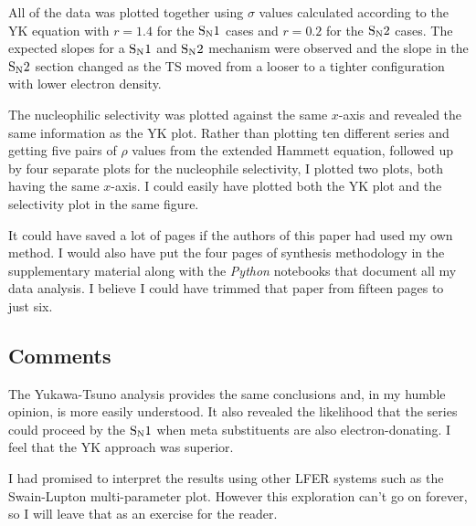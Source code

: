\documentclass{tufte-handout}
\begin{document}
All of the data was plotted together using $\sigma$ values calculated according to the YK equation with $r = 1.4$ for the $\rm S_N1$ cases and $r = 0.2$ for the $\rm S_N2$ cases. The expected slopes for a $\rm S_N1$ and $\rm S_N2$ mechanism were observed and the slope in the $\rm S_N2$ section changed as the TS moved from a looser to a tighter configuration with lower electron density.

The nucleophilic selectivity was plotted against the same $x$-axis and revealed the same information as the YK plot. Rather than plotting ten different series and getting five pairs of $\rho$ values from the extended Hammett equation, followed up by four separate plots for the nucleophile selectivity, I plotted two plots, both having the same $x$-axis. I could easily have plotted both the YK plot and the selectivity plot in the same figure. 

It could have saved a lot of pages if the authors of this paper had used my own method. I would also have put the four pages of synthesis methodology in the supplementary material along with the \textit{Python} notebooks that document all my data analysis. I believe I could have trimmed that paper from fifteen pages to just six.

\subsection{Comments}

The Yukawa-Tsuno analysis provides the same conclusions and, in my humble opinion, is more easily understood. It also revealed the likelihood that the  series could proceed by the $\rm S_N1$ when meta substituents are also electron-donating. I feel that the YK approach was superior. 

I had promised to interpret the results using other LFER systems such as the Swain-Lupton multi-parameter plot. However this exploration can't go on forever, so I will leave that as an exercise for the reader.
\end{document}
